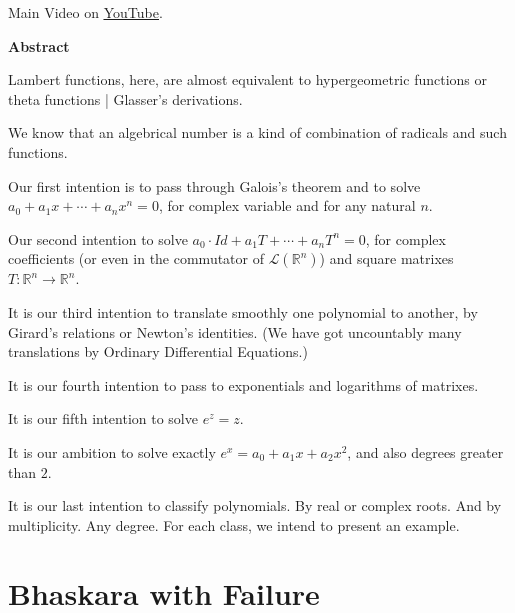 \documentclass[12pt,a4paper]{article}
\begin{document}
Main Video on \href{https://www.youtube.com/watch?v=ivBuwr-Z_mM}{\color{blue}\underline{YouTube}}.

\Large

\vspace{6mm}

\textbf{Abstract}

\normalsize

\vspace{6mm}

Lambert functions, here, are almost equivalent to hypergeometric functions or theta functions | Glasser's derivations.

We know that an algebrical number is a kind of combination of radicals and such functions.

Our first intention is to pass through Galois's theorem and to solve $a_0 + a_1 x + \cdots + a_n x^n = 0$, for complex variable and for any natural $n$.

Our second intention to solve $a_0\cdot Id + a_1 T + \cdots + a_n T^n = 0$, for complex coefficients (or even in the commutator of $\mathcal{L}(\mathbb{R}^n)$) and square matrixes $T : \mathbb{R}^n \to \mathbb{R}^n$.

It is our third intention to translate smoothly one polynomial to another, by Girard's relations or Newton's identities.
(We have got uncountably many translations by Ordinary Differential Equations.)

It is our fourth intention to pass to exponentials and logarithms of matrixes.

It is our fifth intention to solve $e^z = z$.

It is our ambition to solve exactly $e^x = a_0 + a_1 x + a_2 x^2$, and also degrees greater than $2$.

It is our last intention to classify polynomials. By real or complex roots. And by multiplicity. Any degree. For each class, we intend to present an example.

\section{Bhaskara with Failure}
\end{document}
